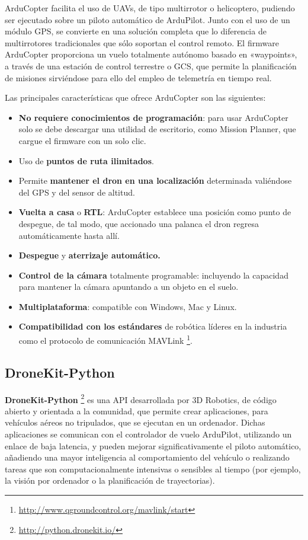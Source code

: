 ArduCopter facilita el uso de \acs{UAV}s, de tipo multirrotor o helicoptero, pudiendo ser ejecutado sobre un piloto automático de ArduPilot.
Junto con el uso de un módulo \acs{GPS}, se convierte en una solución completa que lo diferencia de multirrotores tradicionales que sólo 
soportan el control remoto. El firmware ArduCopter proporciona un vuelo totalmente autónomo basado en «waypoints», a través de 
una estación de control terrestre o \acs{GCS}, que permite la planificación de misiones sirviéndose para ello del empleo de telemetría en tiempo real.

Las principales características que ofrece ArduCopter son las siguientes:
\begin{itemize}
\item \textbf{No requiere conocimientos de programación}: para usar ArduCopter solo se debe descargar una utilidad de escritorio, como 
Mission Planner, que cargue el firmware con un solo clic.
\item Uso de \textbf{puntos de ruta ilimitados}.
\item Permite \textbf{mantener el dron en una localización} determinada valiéndose del \acs{GPS} y del sensor de altitud.
\item \textbf{Vuelta a casa} o \textbf{\acs{RTL}}: ArduCopter establece una posición como punto de despegue, de tal modo, que accionado una palanca el dron regresa automáticamente hasta allí.
\item \textbf{Despegue} y \textbf{aterrizaje automático.}
\item \textbf{Control de la cámara} totalmente programable: incluyendo la capacidad para mantener la cámara apuntando a un objeto en el suelo.
\item \textbf{Multiplataforma}: compatible con Windows, Mac y Linux.
\item \textbf{Compatibilidad con los estándares} de robótica líderes en la industria como el protocolo de comunicación MAVLink \footnote{\url{http://www.qgroundcontrol.org/mavlink/start}}.
\end{itemize}

\subsection{DroneKit-Python}
\label{sec:dronekit}

\textbf{DroneKit-Python} \footnote{\url{http://python.dronekit.io/}} es una \acs{API} desarrollada por 3D Robotics, de código abierto y orientada a la comunidad, que permite crear aplicaciones, para vehículos aéreos no tripulados, que se 
ejecutan en un ordenador. Dichas aplicaciones se comunican con el controlador de vuelo ArduPilot, utilizando un enlace de baja latencia, y pueden mejorar significativamente el piloto automático, añadiendo una mayor inteligencia al comportamiento del vehículo o realizando tareas que son computacionalmente intensivas o sensibles al tiempo (por ejemplo, la visión por ordenador o la planificación de trayectorias).

